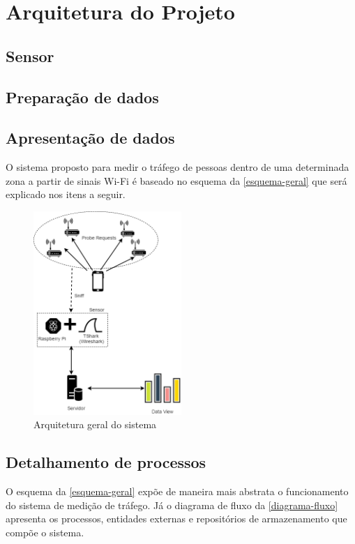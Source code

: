 \chapter{Arquitetura do Projeto}
\label{arq-cap}

\section{Sensor}
\label{sensor-cap}

\section{Preparação de dados}

\section{Apresentação de dados}

O sistema proposto para medir o tráfego de pessoas dentro de uma determinada
zona a partir de sinais Wi-Fi é baseado no esquema da \autoref{esquema-geral}
que será explicado nos itens a seguir.

\begin{figure}[!h]
  \caption{\label{esquema-geral}Arquitetura geral do sistema}
  \begin{center}
    \includegraphics[width=0.50\textwidth]{img/esquema_geral.png}
  \end{center}
\end{figure}

\section{Detalhamento de processos}
O esquema da \autoref{esquema-geral} expõe de maneira mais abstrata o
funcionamento do sistema de medição de tráfego. Já o diagrama de fluxo da
\autoref{diagrama-fluxo} apresenta os processos, entidades externas e
repositórios de armazenamento que compõe o sistema.

